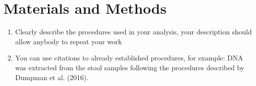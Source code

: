 \section{Materials and Methods}

\begin{enumerate}
    \item Clearly describe the procedures used in your analysis, your description should allow anybody to repeat your work
    \item You can use citations to already established procedures, for example: DNA was extracted from the stool samples following the procedures described by Dumpman et al. (2016).
\end{enumerate}

